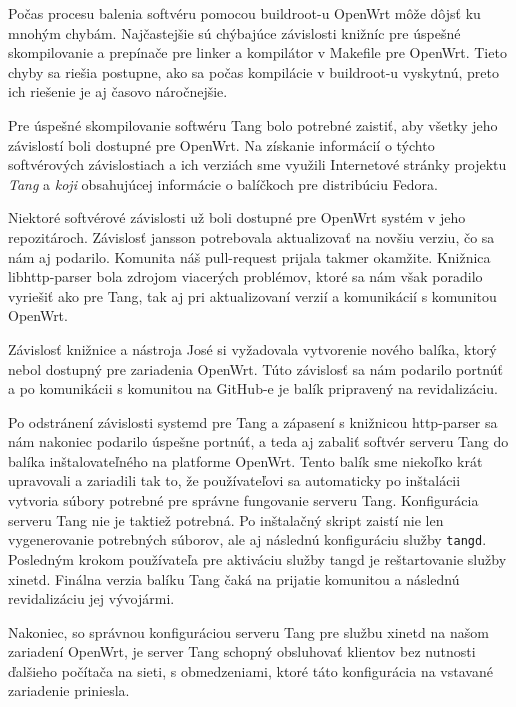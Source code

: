 Počas procesu balenia softvéru pomocou buildroot-u OpenWrt môže dôjsť ku mnohým chybám.
Najčastejšie sú chýbajúce závislosti knižníc pre úspešné skompilovanie a prepínače pre linker a kompilátor v Makefile pre OpenWrt.
Tieto chyby sa riešia postupne, ako sa počas kompilácie v buildroot-u vyskytnú, preto ich riešenie je aj časovo náročnejšie.

Pre úspešné skompilovanie softwéru Tang bolo potrebné zaistiť, aby všetky jeho závislostí boli dostupné pre OpenWrt.
Na získanie informácií o týchto softvérových závislostiach a ich verziách sme využili Internetové stránky projektu {\it Tang} a {\it koji} obsahujúcej informácie o balíčkoch pre distribúciu Fedora.

Niektoré softvérové závislosti už boli dostupné pre OpenWrt systém v jeho repozitároch.
Závislosť jansson potrebovala aktualizovať na novšiu verziu, čo sa nám aj podarilo.
Komunita náš pull-request prijala takmer okamžite.
Knižnica libhttp-parser bola zdrojom viacerých problémov, ktoré sa nám však poradilo vyriešiť ako pre Tang, tak aj pri aktualizovaní verzií a komunikácií s komunitou OpenWrt.

Závislosť knižnice a nástroja José si vyžadovala vytvorenie nového balíka, ktorý nebol dostupný pre zariadenia OpenWrt.
Túto závislosť sa nám podarilo portnúť a po komunikácii s komunitou na GitHub-e je balík pripravený na revidalizáciu.

Po odstránení závislosti systemd pre Tang a zápasení s knižnicou http-parser sa nám nakoniec podarilo úspešne portnúť, a teda aj zabaliť softvér serveru Tang do balíka inštalovateľného na platforme OpenWrt.
Tento balík sme niekoľko krát upravovali a zariadili tak to, že používateľovi sa automaticky po inštalácii vytvoria súbory potrebné pre správne fungovanie serveru Tang.
Konfigurácia serveru Tang nie je taktiež potrebná.
Po inštalačný skript zaistí nie len vygenerovanie potrebných súborov, ale aj následnú konfiguráciu služby {\tt tangd}.
Posledným krokom používateľa pre aktiváciu služby tangd je reštartovanie služby xinetd.
Finálna verzia balíku Tang čaká na prijatie komunitou a následnú revidalizáciu jej vývojármi.

Nakoniec, so správnou konfiguráciou serveru Tang pre službu xinetd na našom zariadení OpenWrt, je server Tang schopný obsluhovať klientov bez nutnosti ďalšieho počítača na sieti, s obmedzeniami, ktoré táto konfigurácia na vstavané zariadenie priniesla.
